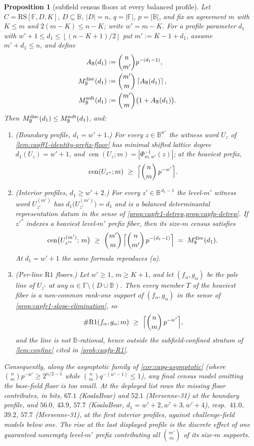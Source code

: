 \documentclass[11pt]{article}
\newtheorem{proposition}[proposition]{Proposition}
\theoremstyle{definition}
\theoremstyle{remark}
\newcommand{\F}{\mathbb{F}}
\newcommand{\B}{\mathbb{B}}
\newcommand{\RS}{\mathrm{RS}}
\providecommand{\ceil}[1]{\left\lceil #1\right\rceil}
\providecommand{\floor}[1]{\left\lfloor #1\right\rfloor}
\providecommand{\Rone}{\mathrm{R1}}
\providecommand{\Cen}{\operatorname{cen}}
\begin{document}
\begin{proposition}[subfield census floors at every balanced profile]
\label{prop:capg-census-floor}
Let $C=\RS[\F,D,K]$, $D\subseteq\B$, $|D|=n$, $q=|\F|$, $p=|\B|$, and
fix an agreement $m$ with $K\le m$ and $2(m-K)\le n-K$; write $w'=m-K$.
For a profile parameter $d_1$ with $w'+1\le d_1\le\floor{(n-K+1)/2}$ put
$m':=K-1+d_1$, assume $m'+d_1\le n$, and define
\[
\begin{aligned}
A_{\B}(d_1)&:=\binom n{m'}p^{-(d_1-1)},\\
M_{\B}^{\rm disc}(d_1)&:=\binom{m'}m\ceil{A_{\B}(d_1)},\\
M_{\B}^{\rm soft}(d_1)&:=\binom{m'}m\bigl(1+A_{\B}(d_1)\bigr).
\end{aligned}
\]
Then $M_{\B}^{\rm disc}(d_1)\le M_{\B}^{\rm soft}(d_1)$, and:
\begin{enumerate}[label=\textup{(\alph*)}]
\item \textup{(Boundary profile, $d_1=w'+1$.)}  For every $z\in\B^{w'}$
the witness word $U_z$ of \cref{lem:capff1-identity-prefix-floor} has
minimal shifted lattice degree $d_1(U_z)=w'+1$, and
$\Cen(U_z;m)=|\Phi_{m,w'}^{-1}(z)|$; at the heaviest prefix,
\[
        \Cen(U_{z^{*}};m)\ \ge\
        \Bigl\lceil\binom nm\,p^{-w'}\Bigr\rceil .
\]
\item \textup{(Interior profiles, $d_1\ge w'+2$.)}  For every
$z'\in\B^{\,d_1-1}$ the level-$m'$ witness word $U^{(m')}_{z'}$ has
$d_1\bigl(U^{(m')}_{z'}\bigr)=d_1$ and is a balanced determinantal
representation datum in the sense of
\cref{prop:capfr1-detrep,prop:capfp-detrep}.  If $z'^{*}$ indexes a heaviest
level-$m'$ prefix fiber, then its size-$m$ census satisfies
\[
        \Cen\bigl(U^{(m')}_{z'^{*}};\,m\bigr)\ \ge\
        \binom{m'}{m}\,\Bigl\lceil\binom n{m'}\,p^{-(d_1-1)}\Bigr\rceil
        \;=\;M_{\B}^{\rm disc}(d_1).
\]
At $d_1=w'+1$ the same formula reproduces \textup{(a)}.
\item \textup{(Per-line $\Rone$ floors.)}  Let $w'\ge1$, $m\ge K+1$, and
let $(f_\alpha,g_\alpha)$ be the pole line of $U_{z^{*}}$ at any
$\alpha\in\F\setminus(D\cup\B)$.  Then every member $T$ of the heaviest
fiber is a non-common rank-one support of $(f_\alpha,g_\alpha)$ in the
sense of \cref{prop:capfr1-slope-elimination}, so
\[
        \#\Rone(f_\alpha,g_\alpha;m)\ \ge\
        \Bigl\lceil\binom nm\,p^{-w'}\Bigr\rceil ,
\]
and the line is not $\B$-rational, hence outside the subfield-confined
stratum of \cref{lem:confine} cited in \cref{prob:capfp-R1}.
\end{enumerate}
Consequently, along the asymptotic family of \cref{cor:capg-asymptotic}
(where $\binom nm p^{-w'}\ge2^{n/2-1}$ while
$\binom nm q^{-(w'-1)}\le1$), any final census model omitting the base-field
floor is too small.  At the deployed list rows the missing floor contributes,
in bits, $67.1$ (KoalaBear) and $52.1$ (Mersenne-31) at the boundary profile,
and $56.0$, $43.9$, $57.7$ (KoalaBear, $d_1=w'+2,w'+3,w'+4$), resp.\
$41.0$, $39.2$, $57.7$ (Mersenne-31), at the first interior profiles, against
challenge-field models below one.  The rise at the last displayed profile is the discrete effect of one guaranteed nonempty level-$m'$ prefix contributing all $\binom{m'}m$ of its size-$m$ supports.
\end{proposition}
\end{document}
